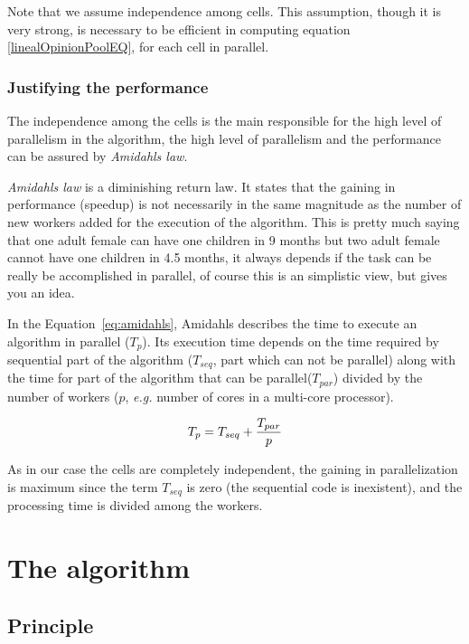 Note that we assume independence among cells. This assumption, though it is very strong, is necessary to be efficient in computing equation \eqref{linealOpinionPoolEQ}, for each cell in parallel. %

\subsubsection{Justifying the performance}

The independence among the cells is the main responsible for the high level of parallelism in the algorithm, the high level of parallelism and the performance can be assured by \textit{Amidahls law}.

\textit{Amidahls law} is a diminishing return law. It states that the gaining in performance (speedup) is not necessarily in the same magnitude as the number of new workers added for the execution of the algorithm\cite{Amdahl:1967:VSP:1465482.1465560}. This is pretty much saying that one adult female can have one children in 9 months but two adult female cannot have one children in 4.5 months, it always depends if the task can be really be accomplished in parallel, of course this is an simplistic view, but gives you an idea.

In the Equation~\ref{eq:amidahls}, Amidahls describes the time to execute an algorithm in parallel ($T_p$). Its execution time depends on the time required by sequential part of the algorithm ($T_{seq}$, part which can not be parallel) along with the time for part of the algorithm that can be parallel($T_{par}$) divided by the number of workers ($p$, \textit{e.g.} number of cores in a multi-core processor).

\begin{equation}
\label{eq:amidahls}
T_p=T_{seq}+{T_{par} \over p}
\end{equation}

As in our case the cells are completely independent, the gaining in parallelization is maximum since the term $T_{seq}$ is zero (the sequential code is inexistent), and the processing time is divided among the workers.

\section{The algorithm}

\subsection{Principle} 

